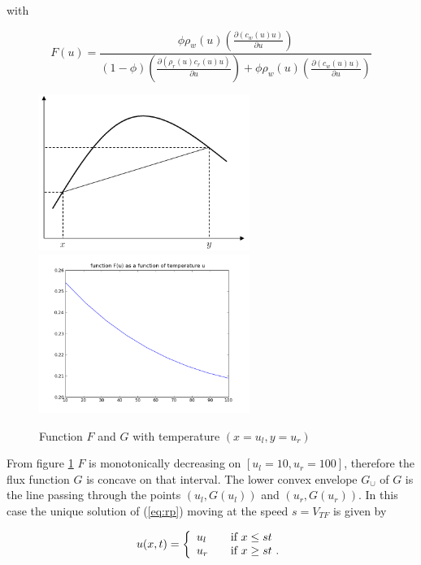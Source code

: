 with 

\begin{equation}\label{eq:FF}
F(u)=\frac{  \phi \rho_{w}(u)\left(  \frac{\partial (c_{w}(u) u)  }{\partial u  }   \right)    }{  (1-\phi)\left( \frac{ \partial (\rho_{r}(u)  c_{r}(u) u) }{\partial u}\right) +  \phi \rho_{w}(u)\left(  \frac{\partial (c_{w}(u)u)  }{\partial u  } \right)     }
\end{equation}

\begin{figure}[H] %
   \centering
   \includegraphics[width=2.7in]{G.png} 
      \includegraphics[width=2.7in]{F.png} 
   \caption{Function $F$ and $G$ with temperature $(x=u_{l}, y=u_{r})$}
   \label{fig:fg}
\end{figure}

From figure \ref{fig:fg} $F$ is monotonically decreasing on $[u_{l}=10,u_{r}=100]$, therefore the flux function $G$ is concave on that interval. The lower convex envelope $G_{\cup}$ of $G$  is the line passing through the points $(u_{l},G(u_{l}))$ and $(u_{r},G(u_{r}))$. In this case the unique solution of (\ref{eq:rp}) moving at the speed $s=V_{TF}$ is given by 

\[ u(x,t) = \left\{ 
  \begin{array}{l l }
    u_{l} & \quad \text{if $x\leq st$ }\\
    
    u_{r} & \quad \text{if $x\geq st$ }.
  \end{array} \right.\]
  
